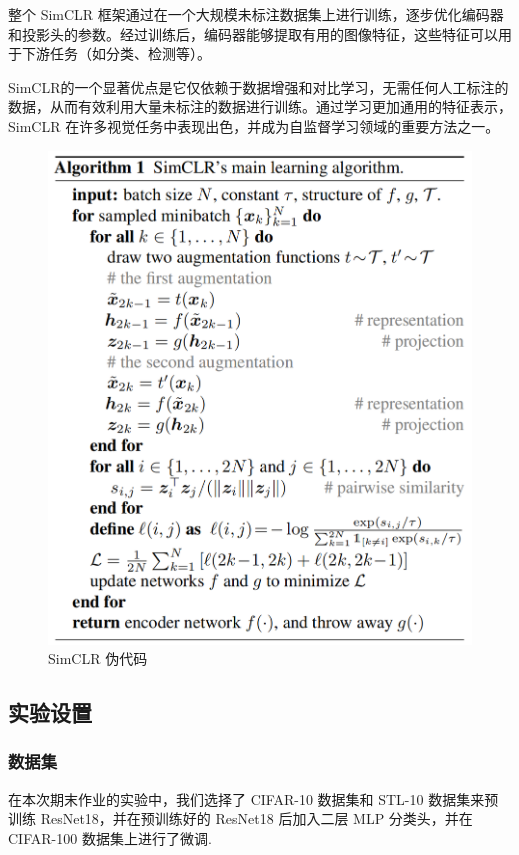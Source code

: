 \documentclass[notitlepage,cs4size,punct,oneside]{ctexrep}
\numberwithin{equation}{chapter}
\theoremstyle{mystyle}
\begin{document}
整个 SimCLR 框架通过在一个大规模未标注数据集上进行训练，逐步优化编码器和投影头的参数。经过训练后，编码器能够提取有用的图像特征，这些特征可以用于下游任务（如分类、检测等）。

SimCLR的一个显著优点是它仅依赖于数据增强和对比学习，无需任何人工标注的数据，从而有效利用大量未标注的数据进行训练。通过学习更加通用的特征表示，SimCLR 在许多视觉任务中表现出色，并成为自监督学习领域的重要方法之一。
\begin{figure}[H]
    \centering
    \includegraphics[scale=0.6]{simclr_code.png}
    \caption{SimCLR 伪代码}
\end{figure}

\subsection{实验设置}
\subsubsection{数据集}
在本次期末作业的实验中，我们选择了 CIFAR-10 数据集和 STL-10 数据集来预训练 ResNet18，并在预训练好的 ResNet18 后加入二层 MLP 分类头，并在 CIFAR-100 数据集上进行了微调.
\end{document}
